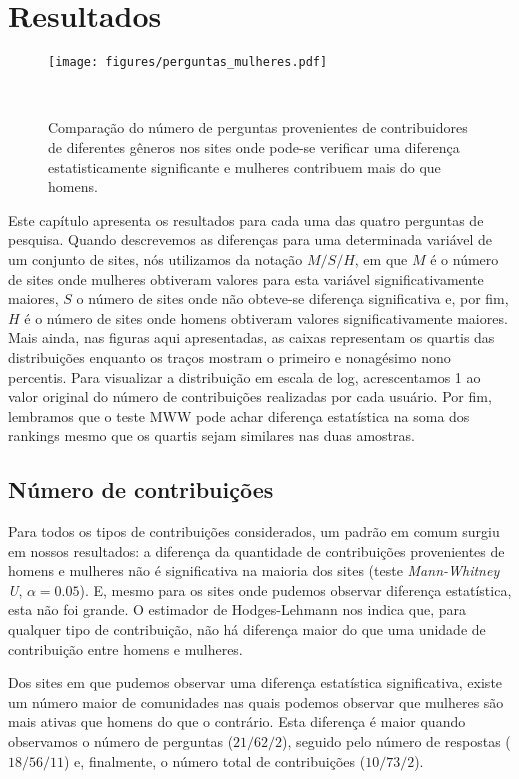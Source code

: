 \chapter{Resultados}
\label{ch:resultados}

\begin{figure}
  \texttt{[image: figures/perguntas\_mulheres.pdf]}
  \caption[Comparação do número de perguntas]{Comparação do número de perguntas provenientes de contribuidores de diferentes gêneros nos sites onde pode-se verificar uma diferença estatisticamente significante e mulheres contribuem mais do que homens.}~\label{fig:questions}
\end{figure}

Este capítulo apresenta os resultados para cada uma das quatro perguntas de pesquisa. Quando descrevemos as diferenças para uma determinada variável de um conjunto de sites, nós utilizamos da notação $M/S/H$, em que $M$ é o número de sites onde mulheres obtiveram valores para esta variável significativamente maiores, $S$ o número de sites onde não obteve-se diferença significativa e, por fim, $H$ é o número de sites onde homens obtiveram valores significativamente maiores. Mais ainda, nas figuras aqui apresentadas, as caixas representam os quartis das distribuições enquanto os traços mostram o primeiro e nonagésimo nono percentis. Para visualizar a distribuição em escala de log, acrescentamos 1 ao valor original do número de contribuições realizadas por cada usuário. Por fim, lembramos que o teste MWW pode achar diferença estatística na soma dos rankings mesmo que os quartis sejam similares nas duas amostras.

\section{Número de contribuições}
Para todos os tipos de contribuições considerados, um padrão em comum surgiu em nossos resultados: a diferença da quantidade de contribuições provenientes de homens e mulheres não é significativa na maioria dos sites (teste \emph{Mann-Whitney U}, $\alpha = 0.05$). E, mesmo para os sites onde pudemos observar diferença estatística, esta não foi grande. O estimador de Hodges-Lehmann nos indica que, para qualquer tipo de contribuição, não há diferença maior do que uma unidade de contribuição entre homens e mulheres.

Dos sites em que pudemos observar uma diferença estatística significativa, existe um número maior de comunidades nas quais podemos observar que mulheres são mais ativas que homens do que o contrário. Esta diferença é maior quando observamos o número de perguntas ($21/62/2$), seguido pelo número de respostas ($18/56/11$) e, finalmente, o número total de contribuições ($10/73/2$). 

